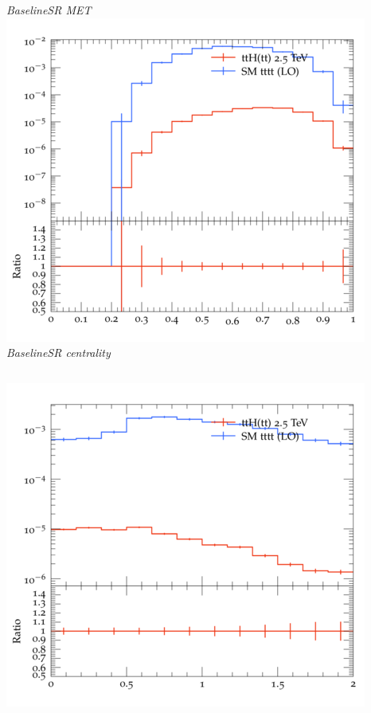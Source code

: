 \documentclass{beamer}
\begin{document}
\begin{frame}
\begin{columns}
\textit{\small BaselineSR MET}
\includegraphics[width=\textwidth]{../plots/ttH_2500/tttt_ttH_1LOS/BaselineSR_centrality.png}\\
\textit{\small BaselineSR centrality}
\end{columns}
\begin{columns}
\includegraphics[width=\textwidth]{../plots/ttH_2500/tttt_ttH_1LOS/BaselineSR_deltaR_bl_min.png}\\

\end{columns}
\end{frame}
\end{document}
